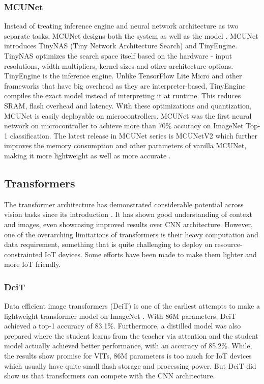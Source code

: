 \documentclass[conference]{IEEEtran}
\begin{document}
	\subsubsection{MCUNet}
	Instead of treating inference engine and neural network architecture as two separate tasks, MCUNet designs both the system as well as the model \cite{mcunet2020}. MCUNet introduces TinyNAS (Tiny Network Architecture Search) and TinyEngine. TinyNAS optimizes the search space itself based on the hardware - input resolutions, width multipliers, kernel sizes and other architecture options. TinyEngine is the inference engine. Unlike TensorFlow Lite Micro and other frameworks that have big overhead as they are interpreter-based, TinyEngine compiles the exact model instead of interpreting it at runtime. This reduces SRAM, flash overhead and latency. With these optimizations and quantization, MCUNet is easily deployable on microcontrollers. MCUNet was the first neural network on microcontroller to achieve more than 70\% accuracy on ImageNet Top-1 classification. The latest release in MCUNet series is MCUNetV2 which further improves the memory consumption and other parameters of vanilla MCUNet, making it more lightweight as well as more accurate \cite{mcunet2021}.
	
	\subsection{Transformers}
	
	The transformer architecture has demonstrated considerable potential across vision tasks since its introduction \cite{vaswani2017}. It has shown good understanding of context and images, even showcasing improved results over CNN architecture. However, one of the overarching limitations of transformers is their heavy computation and data requirement, something that is quite challenging to deploy on resource-constrainted IoT devices. Some efforts have been made to make them lighter and more IoT friendly.
	
	\subsubsection{DeiT}
	Data efficient image transformers (DeiT) is one of the earliest attempts to make a lightweight transformer model on ImageNet \cite{deit2021}. With 86M parameters, DeiT achieved a top-1 accuracy of 83.1\%. Furthermore, a distilled model was also prepared where the student learns from the teacher via attention and the student model actually achieved better performance, with an accuracy of 85.2\%. While, the results show promise for VITs, 86M parameters is too much for IoT devices which usually have quite small flash storage and processing power. But DeiT did show us that transformers can compete with the CNN architecture.
	
\end{document}

